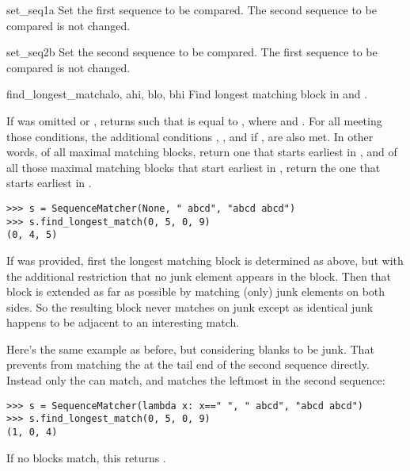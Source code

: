 \begin{methoddesc}{set_seq1}{a}
  Set the first sequence to be compared.  The second sequence to be
  compared is not changed.
\end{methoddesc}

\begin{methoddesc}{set_seq2}{b}
  Set the second sequence to be compared.  The first sequence to be
  compared is not changed.
\end{methoddesc}

\begin{methoddesc}{find_longest_match}{alo, ahi, blo, bhi}
  Find longest matching block in 
  and .

  If  was omitted or ,
   returns  such that  is equal
  to , where
       and
      .
  For all  meeting those
  conditions, the additional conditions
      ,
      ,
      and if , 
  are also met.
  In other words, of all maximal matching blocks, return one that
  starts earliest in , and of all those maximal matching blocks
  that start earliest in , return the one that starts earliest
  in .

\begin{verbatim}
>>> s = SequenceMatcher(None, " abcd", "abcd abcd")
>>> s.find_longest_match(0, 5, 0, 9)
(0, 4, 5)
\end{verbatim}

  If  was provided, first the longest matching block is
  determined as above, but with the additional restriction that no
  junk element appears in the block.  Then that block is extended as
  far as possible by matching (only) junk elements on both sides.
  So the resulting block never matches on junk except as identical
  junk happens to be adjacent to an interesting match.

  Here's the same example as before, but considering blanks to be junk.
  That prevents  from matching the  at the
  tail end of the second sequence directly.  Instead only the
   can match, and matches the leftmost  in
  the second sequence:

\begin{verbatim}
>>> s = SequenceMatcher(lambda x: x==" ", " abcd", "abcd abcd")
>>> s.find_longest_match(0, 5, 0, 9)
(1, 0, 4)
\end{verbatim}

  If no blocks match, this returns .
\end{methoddesc}

